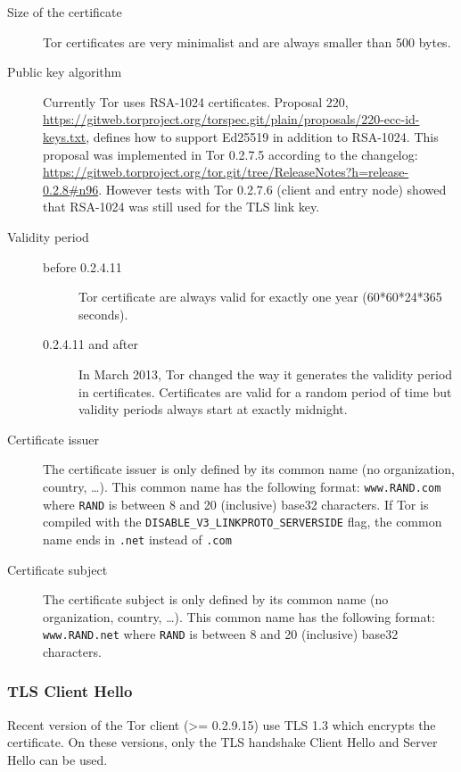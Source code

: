 \documentclass[documentation]{subfiles}
\begin{document}
\begin{description}
    \item[Size of the certificate] Tor certificates are very minimalist and are always smaller than
        500 bytes.
    \item[Public key algorithm] Currently Tor uses RSA-1024 certificates. Proposal 220,
        \url{https://gitweb.torproject.org/torspec.git/plain/proposals/220-ecc-id-keys.txt}, defines
        how to support Ed25519 in addition to RSA-1024. This proposal was implemented in Tor 0.2.7.5
        according to the changelog:
        \url{https://gitweb.torproject.org/tor.git/tree/ReleaseNotes?h=release-0.2.8#n96}.
        However tests with Tor 0.2.7.6 (client and entry node) showed that RSA-1024 was still used for
        the TLS link key.
    \item[Validity period]\hfill
        \begin{description}
            \item[before 0.2.4.11] Tor certificate are always valid for exactly one year (60*60*24*365
                seconds).
            \item[0.2.4.11 and after] In March 2013, Tor changed the way it generates the validity period
                in certificates. Certificates are valid for a random period of time but validity periods
                always start at exactly midnight.
        \end{description}
    \item[Certificate issuer] The certificate issuer is only defined by its common name (no organization,
        country, \ldots). This common name has the following format: {\tt www.RAND.com} where {\tt RAND}
        is between 8 and 20 (inclusive) base32 characters. If Tor is compiled with the
        {\tt DISABLE\_V3\_LINKPROTO\_SERVERSIDE} flag, the common name ends in {\tt .net} instead of
        {\tt .com}
    \item[Certificate subject] The certificate subject is only defined by its common name
        (no organization, country, \ldots). This common name has the following format: {\tt www.RAND.net}
        where {\tt RAND} is between 8 and 20 (inclusive) base32 characters.
\end{description}

\subsubsection{TLS Client Hello}

Recent version of the Tor client (>= 0.2.9.15) use TLS 1.3 which encrypts the certificate.
On these versions, only the TLS handshake Client Hello and Server Hello can be used.
\end{document}
